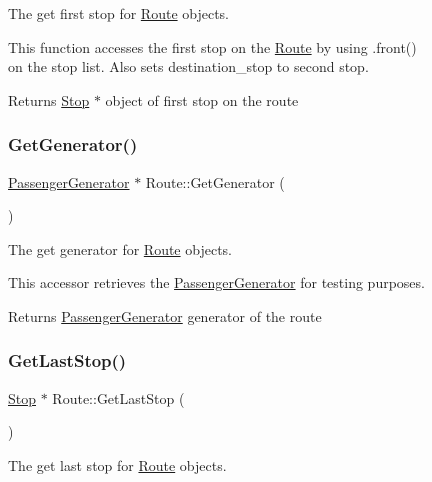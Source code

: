 \begin{figure}[H]
\begin{center}
The get first stop for \hyperlink{classRoute}{Route} objects. 

This function accesses the first stop on the \hyperlink{classRoute}{Route} by using .front() on the stop list. Also sets destination\+\_\+stop to second stop.

\begin{DoxyReturn}{Returns}
\hyperlink{classStop}{Stop} $\ast$ object of first stop on the route 
\end{DoxyReturn}
\mbox{\label{classRoute_a31e5860f665b99829a69c3c7adcb465a}} 
\subsubsection{\texorpdfstring{Get\+Generator()}{GetGenerator()}}
{\footnotesize\ttfamily \hyperlink{classPassengerGenerator}{Passenger\+Generator} $\ast$ Route\+::\+Get\+Generator (\begin{DoxyParamCaption}{ }\end{DoxyParamCaption})}



The get generator for \hyperlink{classRoute}{Route} objects. 

This accessor retrieves the \hyperlink{classPassengerGenerator}{Passenger\+Generator} for testing purposes.

\begin{DoxyReturn}{Returns}
\hyperlink{classPassengerGenerator}{Passenger\+Generator} generator of the route 
\end{DoxyReturn}
\mbox{\label{classRoute_a1b48fed4a2d4095e1732dcd4c6f3a5a5}} 
\subsubsection{\texorpdfstring{Get\+Last\+Stop()}{GetLastStop()}}
{\footnotesize\ttfamily \hyperlink{classStop}{Stop} $\ast$ Route\+::\+Get\+Last\+Stop (\begin{DoxyParamCaption}{ }\end{DoxyParamCaption})}



The get last stop for \hyperlink{classRoute}{Route} objects. 


\end{center}
\end{figure}
